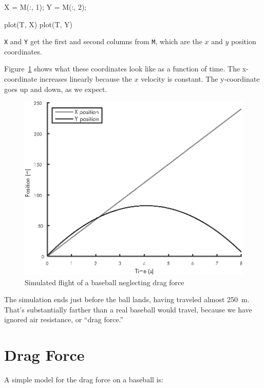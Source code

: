 \begin{code}
    X = M(:, 1);
    Y = M(:, 2);
    
    plot(T, X)
    plot(T, Y)
\end{code}

\lstinline{X} and \lstinline{Y} get the first and second columns from \lstinline{M}, which are the $x$ and $y$ position coordinates.


Figure~\ref{fig:baseball1} shows what these coordinates look like as a function of time.  The x-coordinate increases linearly because the $x$ velocity is constant.  The y-coordinate goes up and down, as we expect.

\begin{figure}[H]
\includegraphics{book/images/figure12_02_new.eps}
\caption{Simulated flight of a baseball neglecting drag force}
\label{fig:baseball1}
\end{figure}

The simulation ends just before the ball lands, having traveled almost \SI{250}{\meter}.  That's substantially farther than a real baseball would travel, because we have ignored air resistance, or ``drag force.''


\section{Drag Force}
\label{drag}


A simple model for the drag force on a baseball is:

